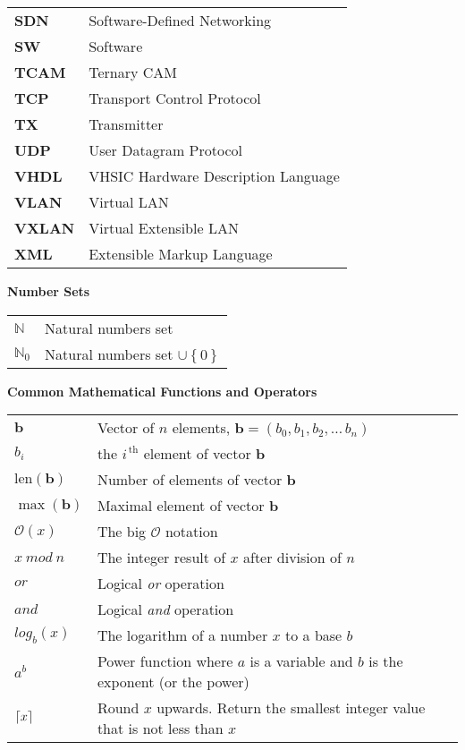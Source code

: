 \begin{longtable}[l]{ll}
\textbf{SDN}     & Software-Defined Networking \\
\textbf{SW}      & Software \\
\textbf{TCAM}    & Ternary CAM \\
\textbf{TCP}     & Transport Control Protocol \\
\textbf{TX}      & Transmitter \\
\textbf{UDP}     & User Datagram Protocol \\
\textbf{VHDL}    & VHSIC Hardware Description Language \\
\textbf{VLAN}    & Virtual LAN\\
\textbf{VXLAN}   & Virtual Extensible LAN\\
\textbf{XML}     & Extensible Markup Language \\
\end{longtable}
\vskip 1cm


\noindent\textbf{Number Sets}\\

\begin{longtable}[l]{ll}
{$\mathbb N$} & Natural numbers set\\
{$\mathbb N_0$} & Natural numbers set $\cup\left\{0\right\}$\\
\end{longtable}
\vskip 1cm

\noindent\textbf{Common Mathematical Functions and Operators}\\

\begin{longtable}[l]{ll}
${\mathbf b}$              & Vector of $n$ elements, ${\mathbf b} = (b_0,b_1,b_2,\dots\,b_n )$\\
$b_{i}$                    & the $i^{\,\mathrm{th}}$ element of vector $\mathbf b$\\
$\text{len}({\mathbf b})$  & Number of elements of vector $\mathbf b$\\
$\max({\mathbf b})$        & Maximal element of vector $\mathbf b$\\
$\mathcal{O}(x)$           & The big $\mathcal{O}$ notation\\
$x\ mod\ n$                & The integer result of $x$ after division of $n$\\
$or$                       & Logical \textit{or} operation\\
$and$                      & Logical \textit{and} operation\\
$log_b\left( x \right)$    & The logarithm of a number $x$ to a base $b$\\
$a^b$                      & Power function where $a$ is a variable and $b$ is the exponent (or the power)\\
$\left\lceil x \right\rceil$                 & Round $x$ upwards. Return the smallest integer value that is not less than $x$\\
\end{longtable}
\vskip 1cm


